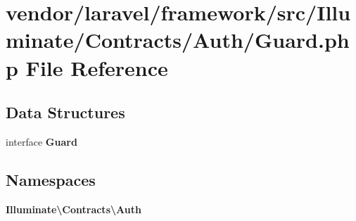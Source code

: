 \section{vendor/laravel/framework/src/\+Illuminate/\+Contracts/\+Auth/\+Guard.php File Reference}
\label{_contracts_2_auth_2_guard_8php}
\subsection*{Data Structures}
\begin{DoxyCompactItemize}
\item 
interface {\bf Guard}
\end{DoxyCompactItemize}
\subsection*{Namespaces}
\begin{DoxyCompactItemize}
\item 
 {\bf Illuminate\textbackslash{}\+Contracts\textbackslash{}\+Auth}
\end{DoxyCompactItemize}
